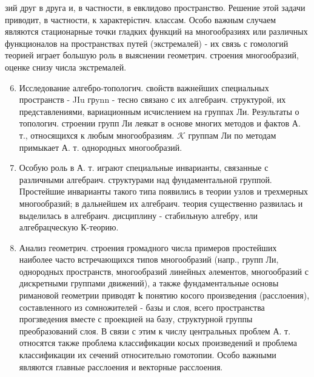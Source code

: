 \documentclass[10pt]{article}
\begin{document}
зий друг в друга и, в частности, в евклидово пространство. Решение этой задачи приводит, в частности, к характерістич. классам. Особо важным случаем являются стационарные точки гладких функций на многообразиях или различных функционалов на пространствах путей (экстремалей) - их связь с гомологий теорией играет большую роль в выяснении геометрич. строения многообразий, оценке снизу числа экстремалей.



\begin{enumerate}

  \setcounter{enumi}{5}

  \item Исследование алгебро-топологич. свойств важнейших специальных пространств - JIu грynn - тесно связано с их алгебраич. структурой, их представлениями, вариационным исчислением на группах Ли. Результаты о топологич. строении групп Ли леякат в основе многих методов и фактов А. т., относящихся к любым многообразиям. $\mathcal{K}$ группам Ли по методам примыкает А. т. однородных многообразий.



  \item Особую роль в А. т. играют специальные инварианты, связанные с различными алгебраич. структурами над фундаментальной группой. Простейшие инварианты такого типа появились в теории узлов и трехмерных многообразий; в дальнейшем их алгебраич. теория существенно развилась и выделилась в алгебраич. дисциплину - стабильную алгебру, или алгебрацческую К-теорию.



  \item Анализ геометрич. строения громадного числа примеров простейших наиболее часто встречающихся типов многообразий (напр., групп Ли, однородных пространств, многообразий линейных әлементов, многообразий с дискретными группами движений), а также фундаментальные основы римановой геометрии приводят $\mathbf{k}$ понятию косого произведения (расслоения), составленного из сомножителей - базы и слоя, всего пространства прогзведения вместе с проекцией на базу, структурной группы преобразований слоя. В связи с этим к числу центральных проблем А. т. относятся также проблема классификации косых произведений и проблема классификации их сечений относительно гомотопии. Особо важными являются главные расслоения и векторные расслоения.



\end{enumerate}
\end{document}
